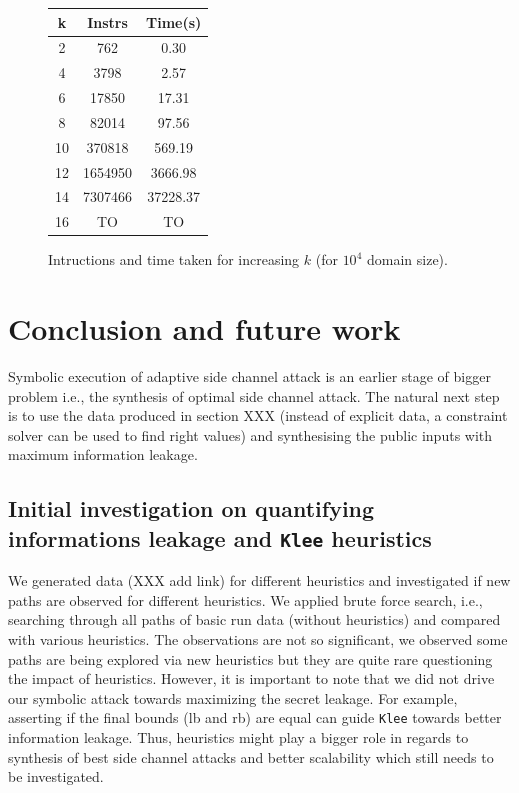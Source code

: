 \documentclass[11pt,a4paper,notitlepage]{article}
\begin{document}
\begin{figure}
\centering
\begin{tabular}{|c|c|c|}
\hline
\textbf{k}  & Instrs  & Time(s) \\ \hline \hline
2  &     762 &     0.30 \\
4  &    3798 &     2.57 \\
6  &   17850 &    17.31 \\
8  &   82014 &    97.56 \\
10 &  370818 &   569.19 \\
12 & 1654950 &  3666.98 \\
14 & 7307466 & 37228.37 \\
16 &  TO &  TO \\
\hline
\end{tabular}
\caption{Intructions and time taken for increasing $k$ (for $10^4$ domain size).}
\label{fig:scalability}
\end{figure}

\section{Conclusion and future work}
\label{sec:futurework}

Symbolic execution of adaptive side channel attack is an earlier stage of bigger problem i.e., the synthesis of optimal side channel attack.
The natural next step is to use the data produced in section XXX (instead of explicit data, a constraint solver can be used to find right values) and synthesising the public inputs with maximum information leakage.

\subsection{Initial investigation on quantifying informations leakage and \texttt{Klee} heuristics}
\label{subsec:initialinvestigationleakage}

We generated data (XXX add link) for different heuristics and investigated if new paths are observed for different heuristics.
We applied brute force search, i.e., searching through all paths of basic run data (without heuristics) and compared with various heuristics.
The observations are not so significant, we observed some paths are being explored via new heuristics but they are quite rare questioning the impact of heuristics.
However, it is important to note that we did not drive our symbolic attack towards maximizing the secret leakage.
For example, asserting if the final bounds (lb and rb) are equal can guide \texttt{Klee} towards better information leakage.
Thus, heuristics might play a bigger role in regards to synthesis of best side channel attacks and better scalability which still needs to be investigated.





\end{document}
